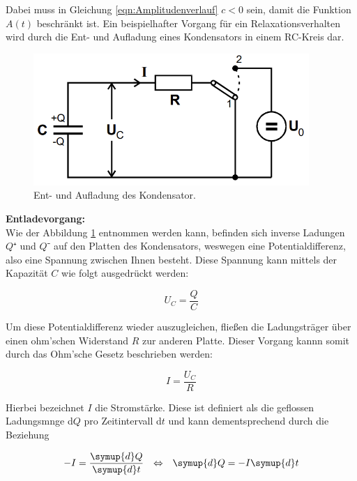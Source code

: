 \noindent Dabei muss in Gleichung \eqref{eqn:Amplitudenverlauf} $c < 0$ sein, damit die Funktion $A(t)$ beschränkt ist.
Ein beispielhafter Vorgang für ein Relaxationsverhalten wird durch die Ent- und Aufladung eines Kondensators in einem 
RC-Kreis dar.

\begin{figure}[H]
    \centering
    \includegraphics[height=5cm]{v353_Schaltkreise_1.png}
    \caption{Ent- und Aufladung des Kondensator.}
    \label{fig:Ladungsvorgang}
\end{figure}

\noindent \textbf{Entladevorgang:}\\
\noindent Wie der Abbildung \ref{fig:Ladungsvorgang} entnommen werden kann, befinden sich inverse Ladungen $Q⁺$ und $Q⁻$ auf den Platten 
des Kondensators, weswegen eine Potentialdifferenz, also eine Spannung zwischen Ihnen besteht. Diese Spannung kann mittels 
der Kapazität $C$ wie folgt ausgedrückt werden:

\begin{equation}
    U_C = \frac{Q}{C}
    \label{eqn:Spannung}
\end{equation}

\noindent Um diese Potentialdifferenz wieder auszugleichen, fließen die Ladungsträger über einen ohm'schen Widerstand $R$ zur anderen Platte.
Dieser Vorgang kannn somit durch das Ohm'sche Gesetz beschrieben werden:

\begin{equation}
    I = \frac{U_C}{R}
    \label{eqn:Ohm}
\end{equation}

\noindent Hierbei bezeichnet $I$ die Stromstärke. Diese ist definiert als die geflossen Ladungsmnge d$Q$ pro Zeitintervall d$t$ und kann dementsprechend
durch die Beziehung

\begin{align}
    -I &= \frac{\symup{d}Q}{\symup{d}t} &\Leftrightarrow& &\symup{d}Q = -I\symup{d}t 
    \label{eqn:Stromstaerke}
\end{align}

